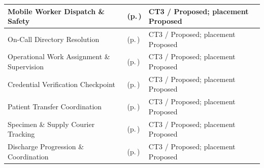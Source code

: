 \begin{longtable}{|>{\raggedright\arraybackslash}p{0.37\TableWidth}|>{\raggedright\arraybackslash}p{0.4\TableWidth}|>{\raggedright\arraybackslash}p{0.23\TableWidth}|}
Mobile Worker Dispatch \& Safety & \nameref{cap:bec-reviewed-mobile-worker-dispatch-safety-coordination} (p.\,\pageref{cap:bec-reviewed-mobile-worker-dispatch-safety-coordination}) & CT3 / Proposed; placement Proposed\\\hline
On-Call Directory Resolution & \nameref{cap:bec-reviewed-on-call-availability-contact-resolution} (p.\,\pageref{cap:bec-reviewed-on-call-availability-contact-resolution}) & CT3 / Proposed; placement Proposed\\\hline
Operational Work Assignment \& Supervision & \nameref{cap:bec-reviewed-operational-work-assignment-dispatch-coordination} (p.\,\pageref{cap:bec-reviewed-operational-work-assignment-dispatch-coordination}) & CT3 / Proposed; placement Proposed\\\hline
Credential Verification Checkpoint & \nameref{cap:bec-reviewed-provider-clinical-qualification-tracking} (p.\,\pageref{cap:bec-reviewed-provider-clinical-qualification-tracking}) & CT3 / Proposed; placement Proposed\\\hline
Patient Transfer Coordination & \nameref{cap:bec-reviewed-patient-transfer-coordination} (p.\,\pageref{cap:bec-reviewed-patient-transfer-coordination}) & CT3 / Proposed; placement Proposed\\\hline
Specimen \& Supply Courier Tracking & \nameref{cap:bec-reviewed-specimen-movement-traceability} (p.\,\pageref{cap:bec-reviewed-specimen-movement-traceability}) & CT3 / Proposed; placement Proposed\\\hline
Discharge Progression \& Coordination & \nameref{cap:bec-reviewed-discharge-progression-coordination} (p.\,\pageref{cap:bec-reviewed-discharge-progression-coordination}) & CT3 / Proposed; placement Proposed\\\hline
\end{longtable}\endgroup
